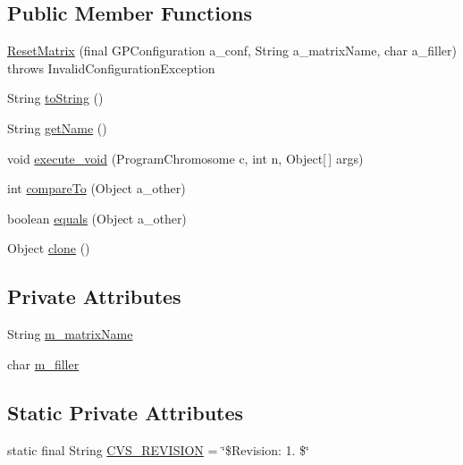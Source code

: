 \subsection*{Public Member Functions}
\begin{DoxyCompactItemize}
\item 
\hyperlink{classorg_1_1jgap_1_1gp_1_1function_1_1_reset_matrix_a361998fd2baee74993541a4614a64986}{Reset\-Matrix} (final G\-P\-Configuration a\-\_\-conf, String a\-\_\-matrix\-Name, char a\-\_\-filler)  throws Invalid\-Configuration\-Exception 
\item 
String \hyperlink{classorg_1_1jgap_1_1gp_1_1function_1_1_reset_matrix_a38f5a6b543eeef9a64853f13a694b961}{to\-String} ()
\item 
String \hyperlink{classorg_1_1jgap_1_1gp_1_1function_1_1_reset_matrix_a6a291e8a2d9dc09b01befb74bc03c10e}{get\-Name} ()
\item 
void \hyperlink{classorg_1_1jgap_1_1gp_1_1function_1_1_reset_matrix_aa10c80f45bf16bd339bcba84e8ca87f4}{execute\-\_\-void} (Program\-Chromosome c, int n, Object\mbox{[}$\,$\mbox{]} args)
\item 
int \hyperlink{classorg_1_1jgap_1_1gp_1_1function_1_1_reset_matrix_aafb2e9632b23aa4b48f08f1548eb3d5b}{compare\-To} (Object a\-\_\-other)
\item 
boolean \hyperlink{classorg_1_1jgap_1_1gp_1_1function_1_1_reset_matrix_a63505fbefec6891aa693229c3d27e792}{equals} (Object a\-\_\-other)
\item 
Object \hyperlink{classorg_1_1jgap_1_1gp_1_1function_1_1_reset_matrix_a0a8d4ba8d0f8ddfc83565b158adad6e3}{clone} ()
\end{DoxyCompactItemize}
\subsection*{Private Attributes}
\begin{DoxyCompactItemize}
\item 
String \hyperlink{classorg_1_1jgap_1_1gp_1_1function_1_1_reset_matrix_a77577c227593cf97bd4f04b47e4a1aeb}{m\-\_\-matrix\-Name}
\item 
char \hyperlink{classorg_1_1jgap_1_1gp_1_1function_1_1_reset_matrix_a0747c94394309e906ecb73f3bd3e6462}{m\-\_\-filler}
\end{DoxyCompactItemize}
\subsection*{Static Private Attributes}
\begin{DoxyCompactItemize}
\item 
static final String \hyperlink{classorg_1_1jgap_1_1gp_1_1function_1_1_reset_matrix_a9314847eb1a3d6e32476a4838d7bf7a2}{C\-V\-S\-\_\-\-R\-E\-V\-I\-S\-I\-O\-N} = \char`\"{}\$Revision\-: 1. \$\char`\"{}
\end{DoxyCompactItemize}
